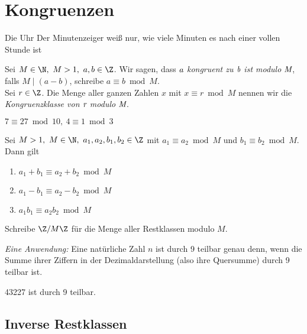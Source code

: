 \chapter{Kongruenzen}\video

\begin{exmp*}
	Die Uhr
	Der Minutenzeiger weiß nur, wie viele Minuten es nach einer vollen Stunde ist
\end{exmp*}

\begin{defn*}
	Sei $M \in \N,\ M > 1,\ a,b \in \Z$. Wir sagen, dass \emph{$\emph{a}$ kongruent zu $\emph{b}$ ist modulo $\emph{M}$}, falls \( M \mid (a-b) \), schreibe \( a \equiv b \bmod M \).\\
	Sei $r \in \Z$. Die Menge aller ganzen Zahlen $x$ mit $x \equiv r \bmod M$ nennen wir die \emph{Kongruenzklasse von $\emph{r}$ modulo $\emph{M}$}.
\end{defn*}

\begin{exmp*}
	\( 7 \equiv  27 \bmod 10,\ 4 \equiv 1 \bmod 3 \)
\end{exmp*}

\begin{lem}\autolabel
	Sei $M > 1,\ M \in \N,\ a_1,a_2,b_1,b_2 \in \Z$ mit $a_1 \equiv a_2 \bmod M$ und $b_1 \equiv b_2 \bmod M$. Dann gilt
	\begin{enumerate}[label={\roman*})]
		\item $a_1 + b_1 \equiv a_2 + b_2 \bmod M$
		\item $a_1 - b_1 \equiv a_2 - b_2 \bmod M$
		\item $a_1b_1 \equiv a_2b_2 \bmod M$
	\end{enumerate}
\end{lem}

\begin{notat*}
	Schreibe \( \Z / M\Z \) für die Menge aller Restklassen modulo $M$.
\end{notat*}

\emph{Eine Anwendung:} Eine natürliche Zahl $n$ ist durch 9 teilbar genau denn, wenn die Summe ihrer Ziffern in der Dezimaldarstellung (also ihre Quersumme) durch 9 teilbar ist.

\begin{exmp*}
	43227 ist durch 9 teilbar.
\end{exmp*}

\section{Inverse Restklassen}

